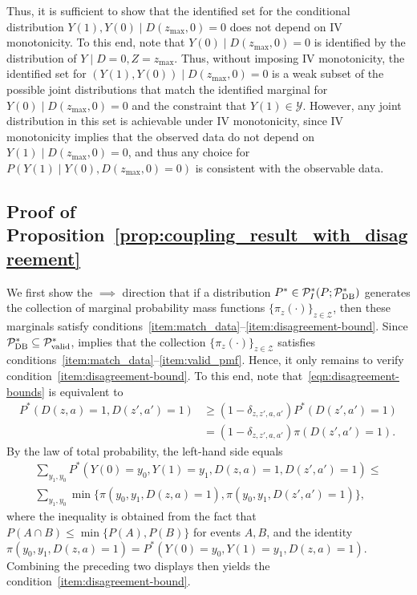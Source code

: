 \documentclass[12pt]{article}%
\theoremstyle{definition}
\newcommand\1{\operatorname{I}\indicatorfence}
\begin{document}
\begin{appendices}
Thus, it is sufficient to show that the identified set for the conditional distribution $Y(1), Y(0) \mid D(z_{\max},0) = 0$ does not depend on IV monotonicity. To this end, note that $Y(0) \mid D(z_{\max},0) = 0$ is identified by the distribution of $Y \mid D=0, Z = z_{\max}$. Thus, without imposing IV monotonicity, the identified set for $(Y(1), Y(0)) \mid D(z_{\max},0) =0$ is a weak subset of the possible joint distributions that match the identified marginal for $Y(0) \mid D(z_{\max},0)=0$ and the constraint that $Y(1) \in \mathcal{Y}$. However, any joint distribution in this set is achievable under IV monotonicity, since IV monotonicity implies that the observed data do not depend on $Y(1) \mid D(z_{\max},0) = 0$, and thus any choice for $P(Y(1) \mid Y(0), D(z_{\max},0)=0)$ is consistent with the observable data.


\subsection{Proof of Proposition~\ref{prop:coupling_result_with_disagreement}}

We first show the $\implies$ direction that if a distribution
$P^* \in \mathcal{P}^*_{I}(P;\mathcal{P}^{*}_{\textnormal{DB}})$ generates the
collection of marginal probability mass functions
$\{\pi_{z}(\cdot) \}_{z \in \mathcal{Z}}$, then these marginals satisfy
conditions~\ref{item:match_data}--\ref{item:disagreement-bound}. Since
$\mathcal{P}^*_{\textrm{DB}}\subseteq\mathcal{P}^*_{\textnormal{valid}}$,
 implies that the collection
$\{\pi_{z}(\cdot) \}_{z \in \mathcal{Z}}$ satisfies
conditions~\ref{item:match_data}--\ref{item:valid_pmf}. Hence, it only remains
to verify condition~\ref{item:disagreement-bound}. To this end, note
that~\eqref{eqn:disagreement-bounds} is equivalent to
  \begin{equation*}
    \begin{split}
      P^*(D(z, a)=1, D(z', a')=1)
      &\geq
        (1-\delta_{z, z', a, a'})P^*(D(z', a')=1)\\
      & =(1-\delta_{z, z', a, a'})\pi(D(z', a')=1).
    \end{split}
  \end{equation*}
  By the law of total probability, the left-hand side equals
  \begin{multline*}
    \sum_{y_1,y_0} P^*(Y(0)=y_0,Y(1) = y_1, D(z, a) = 1, D(z', a') = 1)\leq \\
    \sum_{y_1,y_0} \min\{
    \pi(y_{0}, y_{1}, D(z, a)=1), \pi(y_{0}, y_{1}, D(z', a')=1) \},
  \end{multline*}
  where the inequality is obtained from the fact that $P(A \cap B) \leq \min\{P(A),P(B)\}$ for events $A,B$, and the identity
  $\pi(y_{0}, y_{1}, D(z, a)=1)=P^*(Y(0)=y_0, Y(1) = y_1, D(z, a) = 1)$.
  Combining the preceding two displays then yields the
  condition~\ref{item:disagreement-bound}.


\end{appendices}
\end{document}
